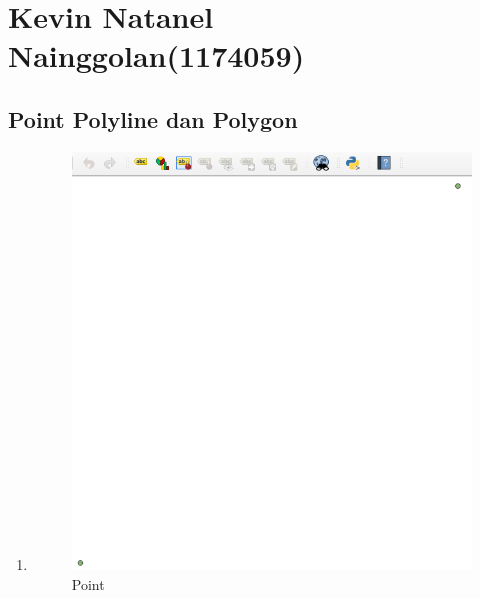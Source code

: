 \section{Kevin Natanel Nainggolan(1174059)}
\subsection{Point Polyline dan Polygon}
\begin{enumerate}
	\item
	
	\begin{figure}[H]
		\includegraphics[width=12cm]{figures/1174059/Python1/soal1.PNG}
		\centering
		\caption{Point}
	\end{figure}
	

\end{enumerate}

